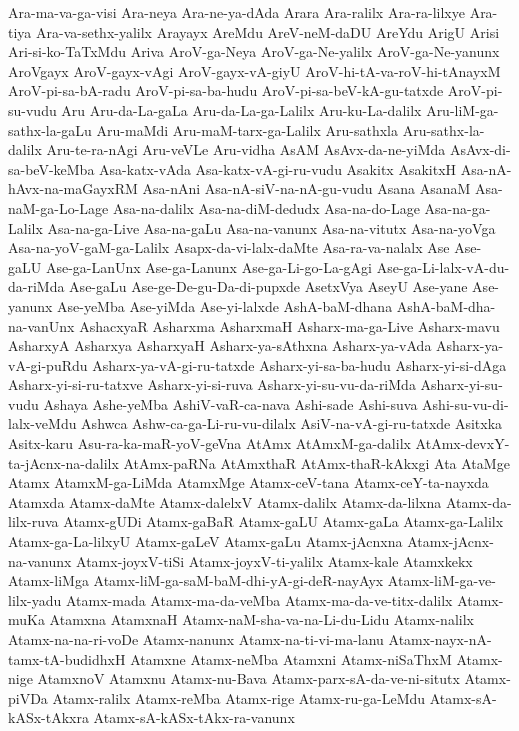 {Ara-ma-va-ga-visi
Ara-neya
Ara-ne-ya-dAda
Arara
Ara-ralilx
Ara-ra-lilxye
Ara-tiya
Ara-va-sethx-yalilx
Arayayx
AreMdu
AreV-neM-daDU
AreYdu
ArigU
Arisi
Ari-si-ko-TaTxMdu
Ariva
AroV-ga-Neya
AroV-ga-Ne-yalilx
AroV-ga-Ne-yanunx
AroVgayx
AroV-gayx-vAgi
AroV-gayx-vA-giyU
AroV-hi-tA-va-roV-hi-tAnayxM
AroV-pi-sa-bA-radu
AroV-pi-sa-ba-hudu
AroV-pi-sa-beV-kA-gu-tatxde
AroV-pi-su-vudu
Aru
Aru-da-La-gaLa
Aru-da-La-ga-Lalilx
Aru-ku-La-dalilx
Aru-liM-ga-sathx-la-gaLu
Aru-maMdi
Aru-maM-tarx-ga-Lalilx
Aru-sathxla
Aru-sathx-la-dalilx
Aru-te-ra-nAgi
Aru-veVLe
Aru-vidha
AsAM
AsAvx-da-ne-yiMda
AsAvx-di-sa-beV-keMba
Asa-katx-vAda
Asa-katx-vA-gi-ru-vudu
Asakitx
AsakitxH
Asa-nA-hAvx-na-maGayxRM
Asa-nAni
Asa-nA-siV-na-nA-gu-vudu
Asana
AsanaM
Asa-naM-ga-Lo-Lage
Asa-na-dalilx
Asa-na-diM-dedudx
Asa-na-do-Lage
Asa-na-ga-Lalilx
Asa-na-ga-Live
Asa-na-gaLu
Asa-na-vanunx
Asa-na-vitutx
Asa-na-yoVga
Asa-na-yoV-gaM-ga-Lalilx
Asapx-da-vi-lalx-daMte
Asa-ra-va-nalalx
Ase
Ase-gaLU
Ase-ga-LanUnx
Ase-ga-Lanunx
Ase-ga-Li-go-La-gAgi
Ase-ga-Li-lalx-vA-du-da-riMda
Ase-gaLu
Ase-ge-De-gu-Da-di-pupxde
AsetxVya
AseyU
Ase-yane
Ase-yanunx
Ase-yeMba
Ase-yiMda
Ase-yi-lalxde
AshA-baM-dhana
AshA-baM-dha-na-vanUnx
AshacxyaR
Asharxma
AsharxmaH
Asharx-ma-ga-Live
Asharx-mavu
AsharxyA
Asharxya
AsharxyaH
Asharx-ya-sAthxna
Asharx-ya-vAda
Asharx-ya-vA-gi-puRdu
Asharx-ya-vA-gi-ru-tatxde
Asharx-yi-sa-ba-hudu
Asharx-yi-si-dAga
Asharx-yi-si-ru-tatxve
Asharx-yi-si-ruva
Asharx-yi-su-vu-da-riMda
Asharx-yi-su-vudu
Ashaya
Ashe-yeMba
AshiV-vaR-ca-nava
Ashi-sade
Ashi-suva
Ashi-su-vu-di-lalx-veMdu
Ashwca
Ashw-ca-ga-Li-ru-vu-dilalx
AsiV-na-vA-gi-ru-tatxde
Asitxka
Asitx-karu
Asu-ra-ka-maR-yoV-geVna
AtAmx
AtAmxM-ga-dalilx
AtAmx-devxY-ta-jAcnx-na-dalilx
AtAmx-paRNa
AtAmxthaR
AtAmx-thaR-kAkxgi
Ata
AtaMge
Atamx
AtamxM-ga-LiMda
AtamxMge
Atamx-ceV-tana
Atamx-ceY-ta-nayxda
Atamxda
Atamx-daMte
Atamx-dalelxV
Atamx-dalilx
Atamx-da-lilxna
Atamx-da-lilx-ruva
Atamx-gUDi
Atamx-gaBaR
Atamx-gaLU
Atamx-gaLa
Atamx-ga-Lalilx
Atamx-ga-La-lilxyU
Atamx-gaLeV
Atamx-gaLu
Atamx-jAcnxna
Atamx-jAcnx-na-vanunx
Atamx-joyxV-tiSi
Atamx-joyxV-ti-yalilx
Atamx-kale
Atamxkekx
Atamx-liMga
Atamx-liM-ga-saM-baM-dhi-yA-gi-deR-nayAyx
Atamx-liM-ga-ve-lilx-yadu
Atamx-mada
Atamx-ma-da-veMba
Atamx-ma-da-ve-titx-dalilx
Atamx-muKa
Atamxna
AtamxnaH
Atamx-naM-sha-va-na-Li-du-Lidu
Atamx-nalilx
Atamx-na-na-ri-voDe
Atamx-nanunx
Atamx-na-ti-vi-ma-lanu
Atamx-nayx-nA-tamx-tA-budidhxH
Atamxne
Atamx-neMba
Atamxni
Atamx-niSaThxM
Atamx-nige
AtamxnoV
Atamxnu
Atamx-nu-Bava
Atamx-parx-sA-da-ve-ni-situtx
Atamx-piVDa
Atamx-ralilx
Atamx-reMba
Atamx-rige
Atamx-ru-ga-LeMdu
Atamx-sA-kASx-tAkxra
Atamx-sA-kASx-tAkx-ra-vanunx
}
